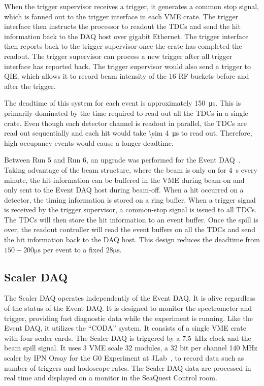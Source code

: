 \documentclass[../main.tex]{subfiles}
\begin{document}
When the trigger supervisor receives a trigger, it generates a common stop signal, which is fanned out
to the trigger interface in each VME crate. The trigger interface then instructs the processor to readout the TDCs
and send the hit information back to the DAQ host over gigabit Ethernet. The trigger interface then
reports back to the trigger supervisor once the crate has completed the readout. The trigger supervisor can process
a new trigger after all trigger interface has reported back. The trigger supervisor would also send a trigger to QIE,
which allows it to record beam intensity of the 16 RF buckets before and after the trigger.

The deadtime of this system for each event is approximately \SI{150}{\micro\second}. This is primarily
dominated by the time required to read out all the TDCs in a single crate. Even though
each detector channel is readout in parallel, the TDCs are read out sequentially
and each hit would take \SI{\sim 4}{\micro\second} to read out. Therefore, high occupancy
events would cause a longer deadtime.

Between Run 5 and Run 6, an upgrade was performed for the Event DAQ~\cite{Kun-1724}.
Taking advantage of the beam structure, where the beam is only on for \SI{4}{\s} every minute,
the hit information can be buffered in the VME during beam-on and only sent to the Event
DAQ host during beam-off. When a hit occurred on a detector,
the timing information is stored on a ring buffer.
When a trigger signal is received by the trigger supervisor,
a common-stop signal is issued to all TDCs. The TDCs will then store the hit information
to an event buffer. Once the spill is over, the readout controller will read the event
buffers on all the TDCs and send the hit information back to the DAQ host.
This design reduces the deadtime from $150 -200\unit{\micro\second}$ per event to a fixed $28\unit{\micro\second}$.

\subsection{Scaler DAQ}
The Scaler DAQ operates independently of the Event DAQ.
It is alive regardless of the status of the Event DAQ.
It is designed to monitor the spectrometer and trigger,
providing fast diagnostic data while the experiment is running. Like the Event DAQ,
it utilizes the ``CODA'' system. It consists of a single VME crate with four scaler
cards. The Scaler DAQ is triggered by a \SI{7.5}{\kilo\hertz} clock and the beam
spill signal. It uses 3 VME scale 32 modules,
a 32 bit per channel 140 MHz scaler by IPN Orsay for the G0 Experiment at JLab~\cite{Scale32},
to record data such as number of triggers
and hodoscope rates. The Scaler DAQ data are processed in real time and displayed
on a monitor in the SeaQuest Control room.
\end{document}
